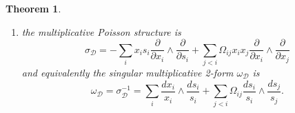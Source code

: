 \documentclass{amsart}
\newtheorem{theorem}{Theorem}[section]
\numberwithin{equation}{section}
\newcommand{\cD}{\mathcal{D}}
\begin{document}
\begin{theorem}
\begin{enumerate}
\[\begin{aligned}
        \end{aligned}\]
    \item the multiplicative Poisson structure is
    \begin{equation}
      \label{eq:2-formGX}
      \sigma_\cD = -\sum_{i} x_i s_i \frac{\partial}{\partial x_i} \wedge \frac{\partial}{\partial s_i}+\sum_{j < i} \Omega_{ij}x_ix_j \frac{\partial}{\partial x_i} \wedge \frac{\partial}{\partial x_j}
    \end{equation}
    and equivalently the singular multiplicative 2-form $\omega_\cD$ is
    \begin{equation} 
      \omega_\cD = \sigma_\cD^{-1} = \sum_{i} \frac{dx_i}{x_i} \wedge \frac{ds_i}{s_i} + \sum_{j < i} \Omega_{ij} \frac{ds_i}{s_i} \wedge \frac{ds_j}{s_j}.
    \end{equation}
  \end{enumerate}
\end{theorem}
\end{document}
